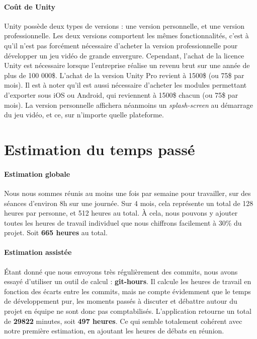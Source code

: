 \paragraph{Coût de Unity}
Unity possède deux types de versions : une version personnelle, et une version professionnelle. Les deux versions comportent les mêmes fonctionnalités, c'est à qu'il n'est pas forcément nécessaire d'acheter la version professionnelle pour développer un jeu vidéo de grande envergure. Cependant, l'achat de la licence Unity est nécessaire lorsque l'entreprise réalise un revenu brut sur une année de plus de 100 000\$. L'achat de la version Unity Pro revient à 1500\$ (ou 75\$ par mois). Il est à noter qu'il est aussi nécessaire d'acheter les modules permettant d'exporter sous iOS ou Android, qui reviennent à 1500\$ chacun (ou 75\$ par mois). La version personnelle affichera néanmoins un \textit{splash-screen} au démarrage du jeu vidéo, et ce, sur n'importe quelle plateforme.

\section{Estimation du temps passé}
 
\paragraph{Estimation globale}
Nous nous sommes réunis au moins une fois par semaine pour travailler, sur des séances d'environ 8h sur une journée. Sur 4 mois, cela représente un total de 128 heures par personne, et 512 heures au total. À cela, nous pouvons y ajouter toutes les heures de travail individuel que nous chiffrons facilement à 30\% du projet. Soit \textbf{665 heures} au total.
 
\paragraph{Estimation assistée}
Étant donné que nous envoyons très régulièrement des commits, nous avons essayé d'utiliser un outil de calcul :  \textbf{git-hours}. Il calcule les heures de travail en fonction des écarts entre les commits, mais ne compte évidemment que le temps de développement pur, les moments passés à discuter et débattre autour du projet en équipe ne sont donc pas comptabilisés. L'application retourne un total de \textbf{29822} minutes, soit \textbf{497 heures}. Ce qui semble totalement cohérent avec notre première estimation, en ajoutant les heures de débats en réunion.


